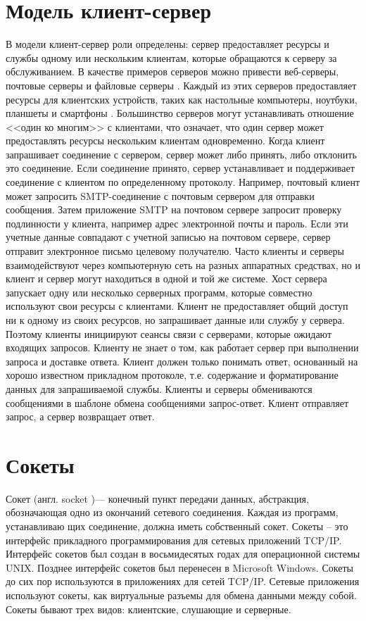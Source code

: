 \section{Модель клиент-сервер}

В модели клиент-сервер роли определены: сервер предоставляет ре­сурсы и службы одному или нескольким клиентам, которые обращаются к серверу за обслуживанием. В качестве примеров серверов можно привести веб­-серверы, почтовые серверы и файловые серверы . Каждый из этих серверов предоставляет ресурсы для клиентских устройств, таких как настольные ком­пьютеры, ноутбуки, планшеты и смартфоны . Большинство серверов могут устанавливать отношение <<один ко многим>> с клиентами, что означает, что один сервер может предоставлять ресурсы нескольким клиентам одновремен­но. Когда клиент запрашивает соединение с сервером, сервер может либо принять, либо отклонить это соединение. Если соединение принято, сервер устанавливает и поддерживает соединение с клиентом по определенному про­токолу. Например, почтовый клиент может запросить SMTP-соединение с почтовым сервером для отправки сообщения. Затем приложение SMTP на почтовом сервере запросит проверку подлинности у клиента, например адрес электронной почты и пароль. Если эти учетные данные совпадают с учетной записью на почтовом сервере, сервер отправит электронное письмо целевому получателю. Часто клиенты и серверы взаимодействуют через компьютерную сеть на разных аппаратных средствах, но и клиент и сервер могут находиться в одной и той же системе. Хост сервера запускает одну или несколько серверных программ, которые совместно используют свои ресурсы с клиентами. Клиент не предоставляет общий доступ ни к одному из своих ресурсов, но запраши­вает данные или службу у сервера. Поэтому клиенты инициируют сеансы связи с серверами, которые ожидают входящих запросов. Клиенту не знает о том, как работает сервер при выполнении запроса и доставке ответа. Клиент должен только понимать ответ, основанный на хорошо известном прикладном протоколе, т.е. содержание и форматирование данных для запрашиваемой службы. Клиенты и серверы обмениваются сообщениями в шаблоне обмена сообщениями запрос-ответ. Клиент отправляет запрос, а сервер возвращает ответ.

\section{Сокеты}

Сокет (англ. socket \cite{socket})— конечный пункт передачи данных, абстракция, обозначающая одно из окончаний сетевого соединения. Каждая из программ, устанавливаю­ щих соединение, должна иметь собственный сокет. Сокеты – это интерфейс прикладного программирования для сетевых приложений TCP/IP. Интерфейс сокетов был создан в восьмидесятых годах для операционной системы UNIX. Позднее интерфейс сокетов был перенесен в Microsoft Windows. Сокеты до сих пор используются в приложениях для сетей TCP/IP. Сетевые приложения используют сокеты, как виртуальные разъемы для обмена данными между собой. Сокеты бывают трех видов: клиентские, слушающие и серверные.

